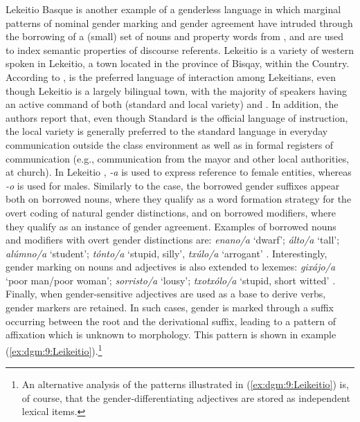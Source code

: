 \documentclass[output=collectionpaper]{langsci/langscibook}
\begin{document}
Lekeitio Basque is another example of a genderless language in which marginal patterns of nominal gender marking and gender agreement have intruded through the borrowing of a (small) set of nouns and property words from , and are used to index semantic properties of discourse referents. Lekeitio  is a variety of western  spoken in Lekeitio, a town located in the province of Bisqay, within the   Country. According to \citet[1--2]{Hualde1994},  is the preferred language of interaction among Lekeitians, even though Lekeitio is a largely bilingual town, with the majority of speakers having an active command of both  (standard and local variety) and . In addition, the authors report that, even though Standard  is the official language of instruction, the local variety is generally preferred to the standard language in everyday communication outside the class environment as well as in formal registers of communication (e.g., communication from the mayor and other local authorities, at church). In Lekeitio , \textit{-a} is used to express reference to female entities, whereas \textit{-o} is used for males. Similarly to the  case, the borrowed gender suffixes appear both on borrowed nouns, where they qualify as a word formation strategy for the overt coding of natural gender distinctions, and on borrowed modifiers, where they qualify as an instance of gender agreement. Examples of borrowed nouns and modifiers with overt gender distinctions are: \textit{enano/a} `dwarf'; \textit{\'alto/a} `tall'; \textit{al\'umno/a} `student'; \textit{t\'onto/a} `stupid, silly', \textit{tx\'ulo/a} `arrogant' \citep[108--109]{Hualde1994}. Interestingly, gender marking on nouns and adjectives is also extended to  lexemes: \textit{gix\'ajo/a} `poor man/poor woman'; \textit{sorristo/a} `lousy'; \textit{txotx\'olo/a} `stupid, short witted' \citep[109]{Hualde1994}. Finally, when gender-sensitive adjectives are used as a base to derive verbs, gender markers are retained. In such cases, gender is marked through a suffix occurring between the root and the derivational suffix, leading to a pattern of affixation which is unknown to  morphology. This pattern is shown in example (\ref{ex:dgm:9:Leikeitio}).\footnote{An alternative analysis of the patterns illustrated in (\ref{ex:dgm:9:Leikeitio}) is, of course, that the gender-differentiating adjectives are stored as independent lexical items.}
\end{document}
